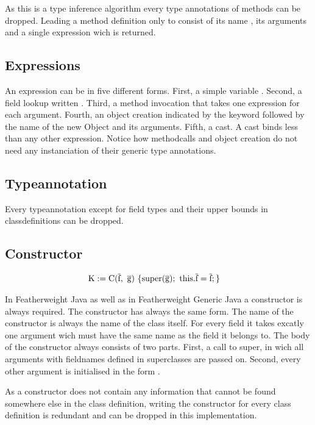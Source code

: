 As this is a type inference algorithm every type annotations of methods can be dropped. Leading a method definition only to consist of its name , its arguments  and a single expression  wich is returned.

\subsection{Expressions}

An expression  can be in five different forms. First, a simple variable . Second, a field lookup written . Third, a method invocation that takes one expression for each argument. Fourth, an object creation indicated by the keyword  followed by the name of the new Object and its arguments. Fifth, a cast.
A cast binds less than any other expression. Notice how methodcalls and object creation do not need any instanciation of their generic type annotations.

\subsection{Typeannotation}

Every typeannotation except for field types and their upper bounds in classdefinitions can be dropped.

\subsection{Constructor}

\begin{align*}
    \text{K} &:= \text{C}(\overline{\text{f}}, \ \overline{\text{g}}) \ \{ \text{super}(\overline{\text{g}}); \ \text{this}.\overline{\text{f}}=\overline{\text{f}}; \}
\end{align*}

In Featherweight Java as well as in Featherweight Generic Java a constructor is always required. The constructor has always the same form.
The name of the constructor is always the name of the class itself. For every field it takes excatly one argument wich must have the same name as the field it belongs to.
The body of the constructor always consists of two parts. First, a call to super, in wich all arguments with fieldnames defined in superclasses are passed on.
Second, every other argument is initialised in the form .

As a constructor does not contain any information that cannot be found somewhere else in the class definition, writing the constructor for every class definition is redundant and can be dropped in this implementation.
